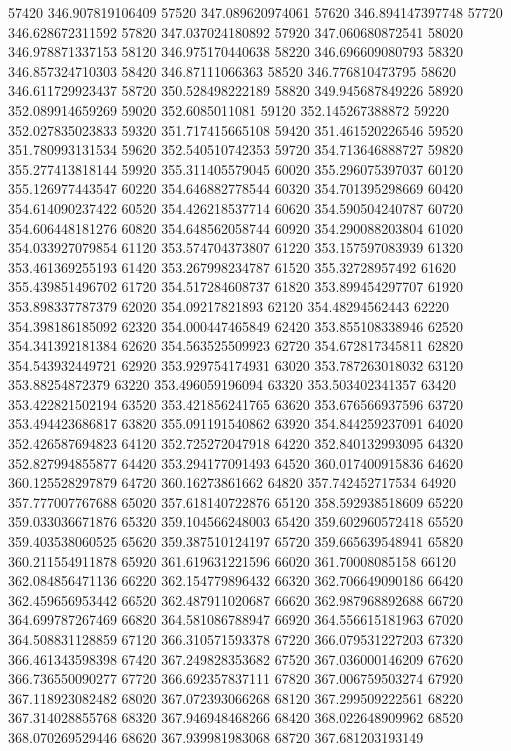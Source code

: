 {57420 346.907819106409
57520 347.089620974061
57620 346.894147397748
57720 346.628672311592
57820 347.037024180892
57920 347.060680872541
58020 346.978871337153
58120 346.975170440638
58220 346.696609080793
58320 346.857324710303
58420 346.87111066363
58520 346.776810473795
58620 346.611729923437
58720 350.528498222189
58820 349.945687849226
58920 352.089914659269
59020 352.6085011081
59120 352.145267388872
59220 352.027835023833
59320 351.717415665108
59420 351.461520226546
59520 351.780993131534
59620 352.540510742353
59720 354.713646888727
59820 355.277413818144
59920 355.311405579045
60020 355.296075397037
60120 355.126977443547
60220 354.646882778544
60320 354.701395298669
60420 354.614090237422
60520 354.426218537714
60620 354.590504240787
60720 354.606448181276
60820 354.648562058744
60920 354.290088203804
61020 354.033927079854
61120 353.574704373807
61220 353.157597083939
61320 353.461369255193
61420 353.267998234787
61520 355.32728957492
61620 355.439851496702
61720 354.517284608737
61820 353.899454297707
61920 353.898337787379
62020 354.09217821893
62120 354.48294562443
62220 354.398186185092
62320 354.000447465849
62420 353.855108338946
62520 354.341392181384
62620 354.563525509923
62720 354.672817345811
62820 354.543932449721
62920 353.929754174931
63020 353.787263018032
63120 353.88254872379
63220 353.496059196094
63320 353.503402341357
63420 353.422821502194
63520 353.421856241765
63620 353.676566937596
63720 353.494423686817
63820 355.091191540862
63920 354.844259237091
64020 352.426587694823
64120 352.725272047918
64220 352.840132993095
64320 352.827994855877
64420 353.294177091493
64520 360.017400915836
64620 360.125528297879
64720 360.16273861662
64820 357.742452717534
64920 357.777007767688
65020 357.618140722876
65120 358.592938518609
65220 359.033036671876
65320 359.104566248003
65420 359.602960572418
65520 359.403538060525
65620 359.387510124197
65720 359.665639548941
65820 360.211554911878
65920 361.619631221596
66020 361.70008085158
66120 362.084856471136
66220 362.154779896432
66320 362.706649090186
66420 362.459656953442
66520 362.487911020687
66620 362.987968892688
66720 364.699787267469
66820 364.581086788947
66920 364.556615181963
67020 364.508831128859
67120 366.310571593378
67220 366.079531227203
67320 366.461343598398
67420 367.249828353682
67520 367.036000146209
67620 366.736550090277
67720 366.692357837111
67820 367.006759503274
67920 367.118923082482
68020 367.072393066268
68120 367.299509222561
68220 367.314028855768
68320 367.946948468266
68420 368.022648909962
68520 368.070269529446
68620 367.939981983068
68720 367.681203193149
}
